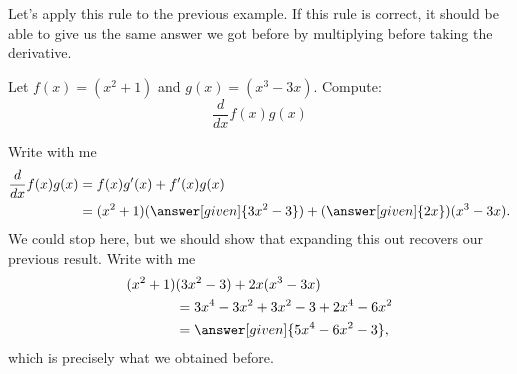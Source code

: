 \documentclass{ximera}
\begin{document}

Let's apply this rule to the previous example. If this rule is correct, it should be able to give us the same answer we got before by multiplying before taking the derivative.
\begin{example} 
Let $f(x)=(x^2+1)$ and $g(x)=(x^3-3x)$. Compute:
\[
\frac{d}{dx} f(x)g(x)
\]

\begin{explanation}
Write with me
\begin{align*}
\frac{d}{dx} f(x)g(x) &= f(x)g'(x) + f'(x)g(x)\\
&=(x^2+1)(\answer[given]{3x^2-3}) + (\answer[given]{2x})(x^3-3x).
\end{align*}
We could stop here, but we should show that expanding this out recovers
our previous result. Write with me
\begin{align*}
(x^2+1)&(3x^2-3) + 2x(x^3-3x)\\
  &= 3x^4-3x^2 +3x^2 -3 + 2x^4-6x^2\\
&=\answer[given]{5x^4-6x^2-3},
\end{align*}
which is precisely what we obtained before.
\end{explanation}
\end{example}
\end{document}
